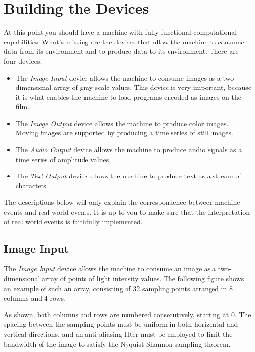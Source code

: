 \documentclass[a4paper,12pt]{article}
\begin{document}
\section{Building the Devices}
\label{sec:building-devices}

At this point you should have a machine with fully functional computational capabilities.
What's missing are the devices that allow the machine to consume data from its environment and to produce data to its environment.
There are four devices:
\begin{itemize}
\item The \emph{Image Input} device allows the machine to consume images as a two-dimensional array of gray-scale values.
  This device is very important, because it is what enables the machine to load programs encoded as images on the film.
\item The \emph{Image Output} device allows the machine to produce color images.
  Moving images are supported by producing a time series of still images.
\item The \emph{Audio Output} device allows the machine to produce audio signals as a time series of amplitude values.
\item The \emph{Text Output} device allows the machine to produce text as a stream of characters.
\end{itemize}
The descriptions below will only explain the correspondence between machine events and real world events.
It is up to you to make sure that the interpretation of real world events is faithfully implemented.

\subsection{Image Input}

The \emph{Image Input} device allows the machine to consume an image as a two-dimensional array of points of light intensity values.
The following figure shows an example of such an array, consisting of 32 sampling points arranged in 8 columns and 4 rows.
\begin{center}
\end{center}
As shown, both columns and rows are numbered consecutively, starting at 0.
The spacing between the sampling points must be uniform in both horizontal and vertical directions, and an anti-aliasing filter must be employed to limit the bandwidth of the image to satisfy the Nyquist-Shannon sampling theorem.
\end{document}
